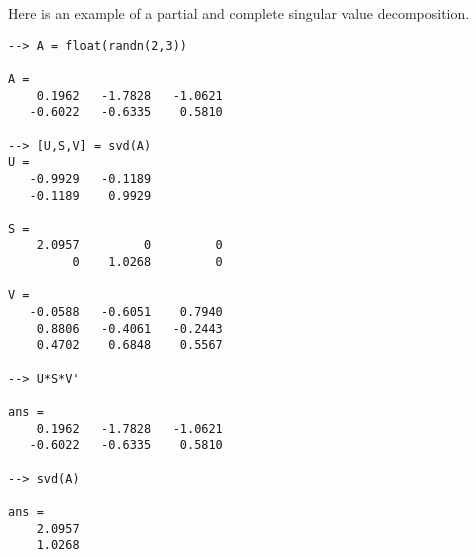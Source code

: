 Here is an example of a partial and complete singular value
decomposition.
\begin{verbatim}
--> A = float(randn(2,3))

A = 
    0.1962   -1.7828   -1.0621 
   -0.6022   -0.6335    0.5810 

--> [U,S,V] = svd(A)
U = 
   -0.9929   -0.1189 
   -0.1189    0.9929 

S = 
    2.0957         0         0 
         0    1.0268         0 

V = 
   -0.0588   -0.6051    0.7940 
    0.8806   -0.4061   -0.2443 
    0.4702    0.6848    0.5567 

--> U*S*V'

ans = 
    0.1962   -1.7828   -1.0621 
   -0.6022   -0.6335    0.5810 

--> svd(A)

ans = 
    2.0957 
    1.0268 
\end{verbatim}
